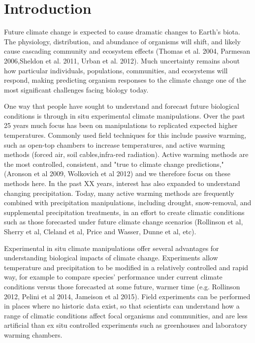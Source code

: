\documentclass{article}
\begin{document}
\section {Introduction}
\par Future climate change is expected to cause dramatic changes to Earth's biota. The physiology, distribution, and abundance of organisms will shift, and likely cause cascading community and ecosystem effects (Thomas et al. 2004, Parmesan 2006,Sheldon et al. 2011, Urban et al. 2012). Much uncertainty remains about how particular individuals, populations, communities, and ecosystems will respond, making predicting organism responses to the climate change one of the most significant challenges facing biology today.
\par One way that people have sought to understand and forecast future biological conditions is through in situ experimental climate manipulations. Over the past 25 years much focus has been on manipulations to replicated expected higher temperatures. Commonly used field techniques for this include passive warming, such as open-top chambers to increase temperatures, and active warming methods (forced air, soil cables,infra-red radiation). Active warming methods are the most controlled, consistent, and "true to climate change predictions," (Aronson et al 2009, Wolkovich et al 2012) and we therefore focus on these methods here. In the past XX years, interest has also expanded to understand changing precipitation. Today, many active warming methods are frequently combined with precipitation manipulations, including drought, snow-removal, and supplemental precipitation treatments, in an effort to create climatic conditions such as those forecasted under future climate change scenarios (Rollinson et al, Sherry et al, Cleland et al, Price and Wasser, Dunne et al, etc).
\par Experimental in situ climate manipulations offer several advantages for understanding biological impacts of climate change. Experiments allow temperature and precipitation to be modified in a relatively controlled and rapid way, for example to compare species' performance under current climate conditions versus those forecasted at some future, warmer time (e.g. Rollinson 2012, Pelini et al 2014, Jameison et al 2015). Field experiments can be performed in places where no historic data exist, so that scientists can understand how a range of climatic conditions affect focal organisms and communities, and are less artificial than ex situ controlled experiments such as greenhouses and laboratory warming chambers.
\end{document}
